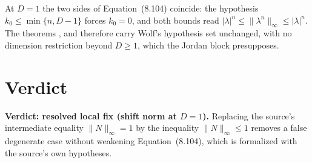 \documentclass{article}
\begin{document}
At $D=1$ the two sides of Equation~(8.104) coincide: the hypothesis
$k_{0}\le\min\{n,D-1\}$ forces $k_{0}=0$, and both bounds read
$|\lambda|^{n}\le\|\lambda^{n}\|_{\infty}\le|\lambda|^{n}$. The theorems
,
 and
 therefore carry Wolf's
hypothesis set unchanged, with no dimension restriction beyond $D\ge 1$, which
the Jordan block presupposes.

\section{Verdict}

\textbf{Verdict: resolved local fix (shift norm at $D=1$).} Replacing the
source's intermediate equality $\|N\|_{\infty}=1$ by the inequality
$\|N\|_{\infty}\le 1$ removes a false degenerate case without weakening
Equation~(8.104), which is formalized with the source's own hypotheses.



\end{document}
